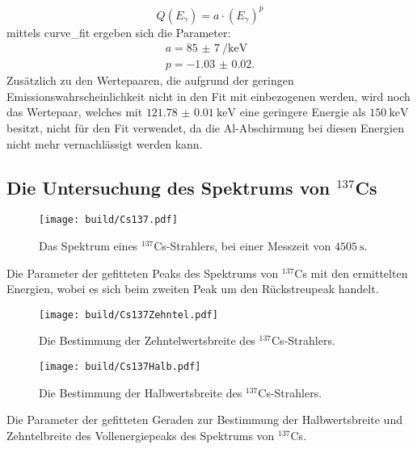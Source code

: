 \begin{equation}
	Q(E_\gamma)=a \cdot (E_\gamma)^p
\end{equation}
mittels curve\_fit \cite{scipy} ergeben sich die Parameter:
\begin{gather*}
    a = \SI{85(7)}{\per\kilo\electronvolt}\\
    p = \num{-1.03(2)}.
\end{gather*}
Zusätzlich zu den Wertepaaren, die aufgrund der geringen Emissionswahrscheinlichkeit nicht in den Fit mit einbezogenen werden, wird noch das Wertepaar, welches mit $\SI{121.78(1)}{\kilo\electronvolt}$ eine geringere Energie als $\SI{150}{\kilo\electronvolt}$ besitzt, nicht für den Fit verwendet, da die Al-Abschirmung bei diesen Energien nicht mehr vernachlässigt werden kann.


\subsection{Die Untersuchung des Spektrums von $^{137}$Cs}
\begin{figure}
	\centering
	\texttt{[image: build/Cs137.pdf]}
	\caption{Das Spektrum eines $^{137}$Cs-Strahlers, bei einer Messzeit von $\SI{4505}{\second}$.}
	\label{fig:2}
\end{figure}
\begin{table}
	\centering
	\caption{Die Parameter der gefitteten Peaks des Spektrums von $^{137}$Cs mit den ermittelten Energien, wobei es sich beim zweiten Peak um den Rückstreupeak handelt.}
	
\end{table}
\begin{figure}
	\centering
	\texttt{[image: build/Cs137Zehntel.pdf]}
	\caption{Die Bestimmung der Zehntelwertsbreite des $^{137}$Cs-Strahlers.}
	\label{fig:10tel}
\end{figure}
\begin{figure}
	\centering
	\texttt{[image: build/Cs137Halb.pdf]}
	\caption{Die Bestimmung der Halbwertsbreite des $^{137}$Cs-Strahlers.}
	\label{fig:2tel}
\end{figure}
\begin{table}
	\centering
	\caption{Die Parameter der gefitteten Geraden zur Bestimmung der Halbwertsbreite und Zehntelbreite des Vollenergiepeaks des Spektrums von $^{137}$Cs.}
	
\end{table}
